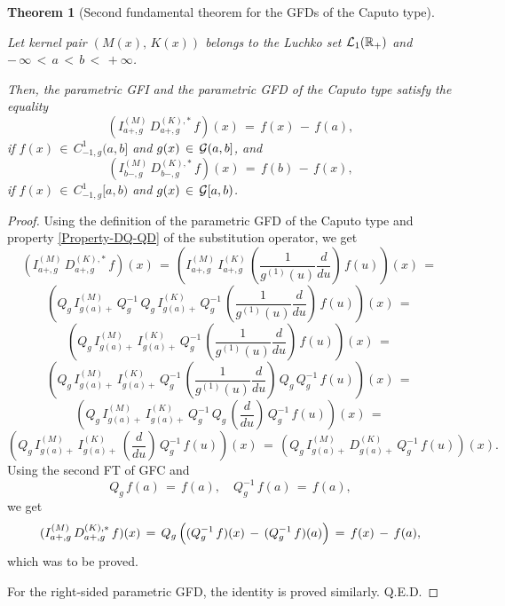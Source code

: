 \documentclass[12pt]{article}
\newtheorem{Theorem}{Theorem}
\begin{document}
\begin{Theorem}[Second fundamental theorem for the GFDs of the Caputo type] 
\label{FT-2-C}

Let kernel pair $(M(x), \, K(x))$ belongs to the Luchko set ${\cal L}_{1}(\mathbb{R}_{+})$ and
$ - \, \infty \, < \, a \, < \, b \, < \, +\infty$.

Then, the parametric GFI and the parametric GFD of the Caputo type satisfy the equality
\[
(I^{(M)}_{a+,g} \, D^{(K),*}_{a+,g} \, f)(x) 
\, = \, f(x) \, - \, f(a) ,
\]
if $f(x) \, \in \, C^{1}_{-1,g}(a,b]$ 
and $g(x) \, \in \, {\cal G}(a,b]$, and 
\[
(I^{(M)}_{b-,g} \, D^{(K),*}_{b-,g} \, f)(x) 
\, = \, f(b) \, - \, f(x) ,
\]
if $f(x) \, \in \, C^{1}_{-1,g}[a,b)$ 
and $g(x) \, \in \, {\cal G}[a,b)$.
\end{Theorem}

\begin{proof}
Using the definition of the parametric GFD of the Caputo type and 
property \eqref{Property-DQ-QD} of the substitution operator, we get
\[
(I^{(M)}_{a+,g} \, D^{(K),*}_{a+,g} \, f)(x) \, = \, 
\left( I^{(M)}_{a+,g} \,
I^{(K)}_{a+,g} \, 
\left(\frac{1}{g^{(1)}(u)} \frac{d}{du} \right)\, 
f(u) \right)(x) \, = \, 
\]
\[
\left( Q_g \, I^{(M)}_{g(a)+} \, Q^{-1}_g \, Q_g \, 
I^{(K)}_{g(a)+} \, Q^{-1}_g \, 
\left(\frac{1}{g^{(1)}(u)} \frac{d}{du} \right)\, 
f(u) \right)(x) \, = \, 
\]
\[
\left( Q_g \, I^{(M)}_{g(a)+} \, 
I^{(K)}_{g(a)+} \, Q^{-1}_g \, 
\left(\frac{1}{g^{(1)}(u)} \frac{d}{du} \right)\, 
f(u) \right)(x) \, = \, 
\]
\[
\left( Q_g \, I^{(M)}_{g(a)+} \, 
I^{(K)}_{g(a)+} \, Q^{-1}_g \, 
\left(\frac{1}{g^{(1)}(u)} \frac{d}{du} \right)
\, Q_g \, Q^{-1}_g \, 
f(u) \right)(x) \, = \, 
\]
\[
\left( Q_g \, I^{(M)}_{g(a)+} \, 
I^{(K)}_{g(a)+} \, Q^{-1}_g \, Q_g \, 
\left(\frac{d}{du} \right)\, Q^{-1}_g \, 
f(u) \right)(x) \, = \, 
\]
\[
\left( Q_g \, I^{(M)}_{g(a)+} \, 
I^{(K)}_{g(a)+} \, \left(\frac{d}{du} \right)\, Q^{-1}_g \, 
f(u) \right)(x) \, = \, 
\left( Q_g \, I^{(M)}_{g(a)+} \, 
D^{(K)}_{g(a)+} \, Q^{-1}_g \, f(u) \right)(x) . 
\]
Using the second FT of GFC \cite{Luchko2023} and
\[
Q_g \, f(a) \, = \, f(a) , \quad
Q^{-1}_g \, f(a) \, = \, f(a) , 
\]
we get
\[
(I^{(M)}_{a+,g} \, D^{(K),*}_{a+,g} \, f)(x) \, = \, 
Q_g \, \Bigl( (Q^{-1}_g \, f)(x) \, - \, 
(Q^{-1}_g \, f)(a) \Bigr) \, = \, 
f(x) \, - \, f(a) ,
\]
which was to be proved. 

For the right-sided parametric GFD, the identity is proved similarly.
Q.E.D.
\end{proof}
\end{document}
